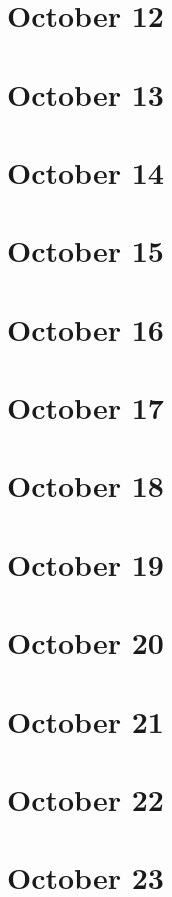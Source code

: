 \section{October 12}

\section{October 13}

\section{October 14}

\section{October 15}

\section{October 16}

\section{October 17}

\section{October 18}

\section{October 19}

\section{October 20}

\section{October 21}

\section{October 22}

\section{October 23}

